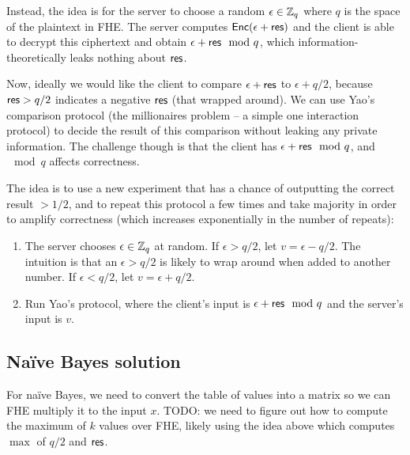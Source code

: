 \documentclass[11pt]{article}
\begin{document}
Instead, the idea is for the server to choose a random $\epsilon \in {\mathbb Z}_q$ where $q$ is the space of the plaintext in FHE. The server computes $\mathsf{Enc}(\epsilon + \mathsf{res})$ and the client is able to decrypt this ciphertext and obtain $\epsilon + \mathsf{res} \mod q$, which information-theoretically leaks nothing about $\mathsf{res}$. 

Now, ideally we would like the client to compare $\epsilon + \mathsf{res}$ to $\epsilon + q/2$, because $\mathsf{res} > q/2$ indicates a negative $\mathsf{res}$ (that wrapped around). We can use Yao's comparison protocol (the millionaires problem -- a simple one interaction protocol) to decide the result of this comparison without leaking any private information. The challenge though is that the client has $\epsilon + \mathsf{res} \mod q$, and $\mod q$ affects correctness.

The idea is to use a new experiment that has a chance of outputting the correct result $>1/2$, and to repeat this protocol a few times and take majority in order to amplify correctness (which increases exponentially in the number of repeats):

\newcommand{\eps}{\epsilon}

\begin{enumerate}
\item The server chooses $\epsilon \in {\mathbb Z}_q$ at random. If $\epsilon > q/2$,  let $v = \eps - q/2$. The intuition is that an $\eps > q/2$ is likely to wrap around when added to another number. If $\eps < q/2$, let $v = \eps + q/2$. 
\item Run Yao's protocol, where the client's input is $\eps + \res \mod q$ and the server's input is $v$. 
\end{enumerate}




 
\subsection{Na\"ive Bayes solution}

For na\"ive Bayes, we need to convert the table of values into a matrix so we can FHE multiply it to the input $x$. TODO: we need to figure out how to compute the maximum of $k$ values over FHE, likely using the idea above which computes $\max$ of $q/2$ and $\mathsf{res}$. 
\end{document}
